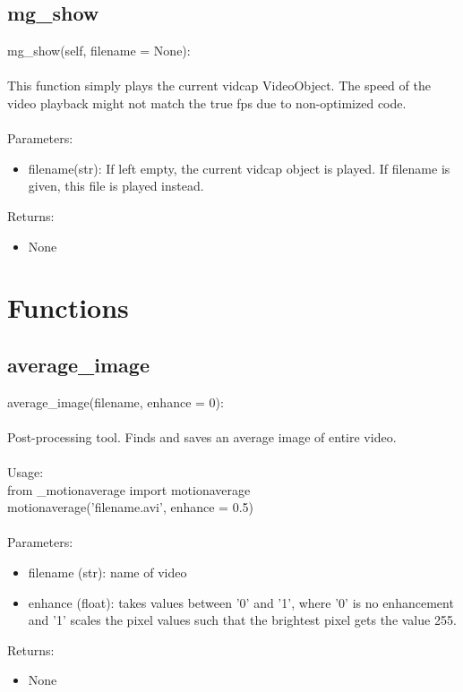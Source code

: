 \documentclass[9pt]{extarticle}
\begin{document}
\subsection{mg\_show}
mg\_show(self, filename = None):
\\\\
This function simply plays the current vidcap VideoObject. The speed of the video playback 
might not match the true fps due to non-optimized code. 
\\\\
Parameters:
\begin{itemize}
\item[] filename(str): If left empty, the current vidcap object is played. If filename is given,
this file is played instead.
\end{itemize}
Returns:
\begin{itemize}
    \item[] None
\end{itemize}



\section{Functions}
\subsection{average\_image}
    average\_image(filename, enhance = 0):
    \\\\
    Post-processing tool. Finds and saves an average image of entire video. \\\\Usage:\\
    from \_motionaverage import motionaverage
    \\motionaverage('filename.avi', enhance = 0.5)
    \\\\
    Parameters:
    \begin{itemize}
        \item [] filename (str): name of video 
        \item [] enhance (float): takes values between '0' and '1', where '0' is no enhancement and '1' scales the pixel values such that the brightest pixel gets the value 255. 
    \end{itemize}
    Returns:
    \begin{itemize}
        \item [] None
    \end{itemize}
\end{document}
